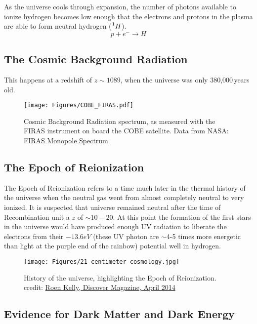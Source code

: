 As the universe cools through expansion, the number of photons available to ionize hydrogen becomes low enough that the electrons and protons in the plasma are able to form neutral hydrogen ($\prescript{1}{}H$). 
\begin{equation}
p + e^- \longrightarrow H
\end{equation}

\subsection{The Cosmic Background Radiation}
This happens at a redshift of $z \sim 1089$, when the universe was only 380,000\,years old.

\begin{figure}[h]
\centering
\texttt{[image: Figures/COBE\_FIRAS.pdf]}
\caption{Cosmic Background Radiation spectrum, as measured with the FIRAS instrument on board the COBE satellite. Data from NASA: \href{http://lambda.gsfc.nasa.gov/product/cobe/firas_prod_table.cfm}{FIRAS Monopole Spectrum}}
\label{fig:FIRAS}
\end{figure}

\subsection{The Epoch of Reionization}
The Epoch of Reionization refers to a time much later in the thermal history of the universe when the neutral gas went from almost completely neutral to very ionized. It is suspected that
universe remained neutral after the time of Recombination unit a $z$ of $\sim 10-20$. At this point the formation of the first stars in the universe would have produced enough UV radiation to liberate the electrons from their $-13.6 eV$ (these UV photon are $\sim$4-5 times more energetic than light at the purple end of the rainbow) potential well in hydrogen. 
\begin{figure}[h]
\centering
\texttt{[image: Figures/21-centimeter-cosmology.jpg]}
\caption{History of the universe, highlighting the Epoch of Reionization.
credit: \href{http://discovermagazine.com/2014/april/12-first-light}{Roen Kelly, Discover Magazine, April 2014}}
\label{fig:EoR}
\end{figure}

\subsection{Evidence for Dark Matter and Dark Energy}

